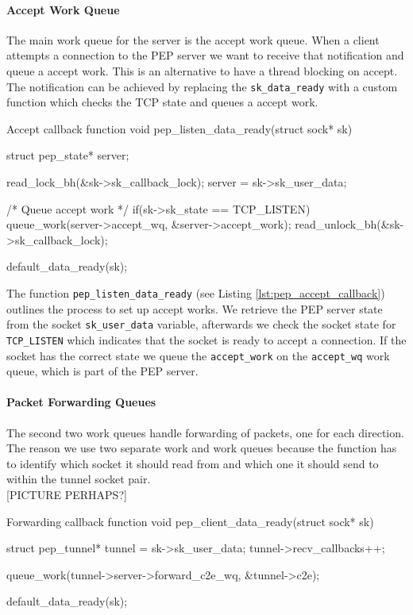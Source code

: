 \documentclass[a4paper,english, 11pt]{report}
\begin{document}
\paragraph{Accept Work Queue}
The main work queue for the server is the accept work queue. When a client attempts a connection to the PEP server we want to receive that notification and queue a accept work. This is an alternative to have a thread blocking on accept. The notification can be achieved by replacing the \verb|sk_data_ready| with a custom function which checks the TCP state and queues a accept work.\\

\begin{autonumlstlisting}[label=lst:pep_accept_callback]{Accept callback function}
void pep_listen_data_ready(struct sock* sk)
{
	struct pep_state* server;

	read_lock_bh(&sk->sk_callback_lock);
	server = sk->sk_user_data;

	/* Queue accept work */
	if(sk->sk_state == TCP_LISTEN){
		queue_work(server->accept_wq, &server->accept_work);
	}
	read_unlock_bh(&sk->sk_callback_lock);

	default_data_ready(sk);
}
\end{autonumlstlisting}

The function \verb|pep_listen_data_ready| (see Listing \ref{lst:pep_accept_callback}) outlines the process to set up accept works. We retrieve the PEP server state from the socket \verb|sk_user_data| variable, afterwards we check the socket state for \verb|TCP_LISTEN| which indicates that the socket is ready to accept a connection. If the socket has the correct state we queue the \verb|accept_work| on the \verb|accept_wq| work queue, which is part of the PEP server.

\paragraph{Packet Forwarding Queues}\label{sec:forward_queues}
The second two work queues handle forwarding of packets, one for each direction. The reason we use two separate work and work queues because the function has to identify which socket it should read from and which one it should send to within the tunnel socket pair. \\

[PICTURE PERHAPS?]

\begin{autonumlstlisting}[label=lst:pep_forward_callback]{Forwarding callback function}
void pep_client_data_ready(struct sock* sk)
{
	struct pep_tunnel* tunnel = sk->sk_user_data;
	tunnel->recv_callbacks++;
        
	queue_work(tunnel->server->forward_c2e_wq, &tunnel->c2e);
        
	default_data_ready(sk);
}
\end{autonumlstlisting}
\end{document}
